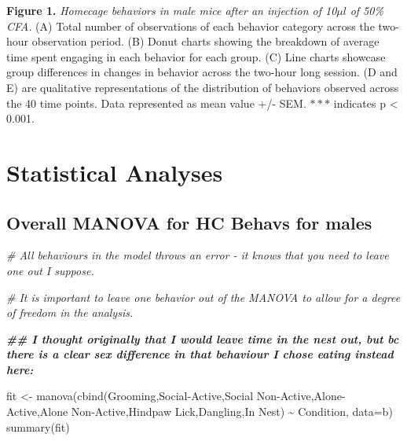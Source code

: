 \documentclass[
]{book}
\newenvironment{Shaded}{\begin{snugshade}}{\end{snugshade}}
\newcommand{\AttributeTok}[1]{\textcolor[rgb]{0.77,0.63,0.00}{#1}}
\newcommand{\CommentTok}[1]{\textcolor[rgb]{0.56,0.35,0.01}{\textit{#1}}}
\newcommand{\DocumentationTok}[1]{\textcolor[rgb]{0.56,0.35,0.01}{\textbf{\textit{#1}}}}
\newcommand{\FunctionTok}[1]{\textcolor[rgb]{0.00,0.00,0.00}{#1}}
\newcommand{\NormalTok}[1]{#1}
\newcommand{\OtherTok}[1]{\textcolor[rgb]{0.56,0.35,0.01}{#1}}
\newcommand{\SpecialCharTok}[1]{\textcolor[rgb]{0.00,0.00,0.00}{#1}}
\newcommand{\StringTok}[1]{\textcolor[rgb]{0.31,0.60,0.02}{#1}}
\begin{document}
\textbf{Figure 1.} \emph{Homecage behaviors in male mice after an injection of 10}\(\mu l\) \emph{of 50\% CFA.} (A) Total number of observations of each behavior category across the two-hour observation period. (B) Donut charts showing the breakdown of average time spent engaging in each behavior for each group. (C) Line charts showcase group differences in changes in behavior across the two-hour long session. (D and E) are qualitative representations of the distribution of behaviors observed across the 40 time points. Data represented as mean value +/- SEM. \(***\) indicates p \textless{} 0.001.

\hypertarget{statistical-analyses}{%
\section*{Statistical Analyses}\label{statistical-analyses}}

\hypertarget{overall-manova-for-hc-behavs-for-males}{%
\subsection*{Overall MANOVA for HC Behavs for males}\label{overall-manova-for-hc-behavs-for-males}}

\begin{Shaded}
\begin{Highlighting}[]
\CommentTok{\# All behaviours in the model throws an error {-} it knows that you need to leave one out I suppose. }

\CommentTok{\# It is important to leave one behavior out of the MANOVA to allow for a degree of freedom in the analysis. }

\DocumentationTok{\#\# I thought originally that I would leave time in the nest out, but bc there is a clear sex difference in that behaviour I chose eating instead here: }

\NormalTok{fit }\OtherTok{\textless{}{-}} \FunctionTok{manova}\NormalTok{(}\FunctionTok{cbind}\NormalTok{(Grooming,}\StringTok{\textasciigrave{}}\AttributeTok{Social{-}Active}\StringTok{\textasciigrave{}}\NormalTok{,}\StringTok{\textasciigrave{}}\AttributeTok{Social Non{-}Active}\StringTok{\textasciigrave{}}\NormalTok{,}\StringTok{\textasciigrave{}}\AttributeTok{Alone{-}Active}\StringTok{\textasciigrave{}}\NormalTok{,}\StringTok{\textasciigrave{}}\AttributeTok{Alone Non{-}Active}\StringTok{\textasciigrave{}}\NormalTok{,}\StringTok{\textasciigrave{}}\AttributeTok{Hindpaw Lick}\StringTok{\textasciigrave{}}\NormalTok{,}\StringTok{\textasciigrave{}}\AttributeTok{Dangling}\StringTok{\textasciigrave{}}\NormalTok{,}\StringTok{\textasciigrave{}}\AttributeTok{In Nest}\StringTok{\textasciigrave{}}\NormalTok{) }\SpecialCharTok{\textasciitilde{}}\NormalTok{ Condition, }\AttributeTok{data=}\NormalTok{b)}
\FunctionTok{summary}\NormalTok{(fit)}
\end{Highlighting}
\end{Shaded}
\end{document}
